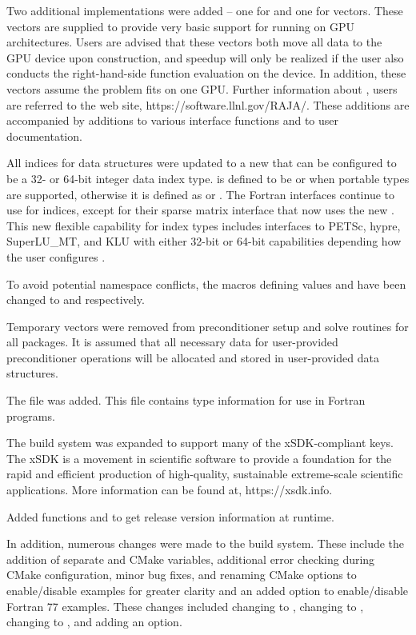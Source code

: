 Two additional {\nvector} implementations were added -- one for
{\cuda} and one for {\raja} vectors.
These vectors are supplied to provide very basic support for running
on GPU architectures.  Users are advised that these vectors both move all data
to the GPU device upon construction, and speedup will only be realized if the
user also conducts the right-hand-side function evaluation on the device.
In addition, these vectors assume the problem fits on one GPU.
Further information about {\raja}, users are referred to the web site,
https://software.llnl.gov/RAJA/.
These additions are accompanied by additions to various interface functions
and to user documentation.

All indices for data structures were updated to a new  that
can be configured to be a 32- or 64-bit integer data index type.
 is defined to be  or  when portable types are
supported, otherwise it is defined as  or .
The Fortran interfaces continue to use  for indices, except for
their sparse matrix interface that now uses the new .
This new flexible capability for index types includes interfaces to
PETSc, hypre, SuperLU\_MT, and KLU with
either 32-bit or 64-bit capabilities depending how the user configures
{\sundials}.

To avoid potential namespace conflicts, the macros defining 
values  and  have been changed to  and
 respectively.

Temporary vectors were removed from preconditioner setup and solve
routines for all packages.  It is assumed that all necessary data
for user-provided preconditioner operations will be allocated and
stored in user-provided data structures.

The file  was added.  This file contains
{\sundials} type information for use in Fortran programs.

The build system was expanded to support many of the xSDK-compliant keys.
The xSDK is a movement in scientific software to provide a foundation for the
rapid and efficient production of high-quality,
sustainable extreme-scale scientific applications.  More information can
be found at, https://xsdk.info.

Added functions  and  to
get {\sundials} release version information at runtime.

In addition, numerous changes were made to the build system.
These include the addition of separate  and 
CMake variables, additional error checking during CMake configuration,
minor bug fixes, and renaming CMake options to enable/disable examples
for greater clarity and an added option to enable/disable Fortran 77 examples.
These changes included changing  to ,
changing  to , changing  to
, and adding an  option.

